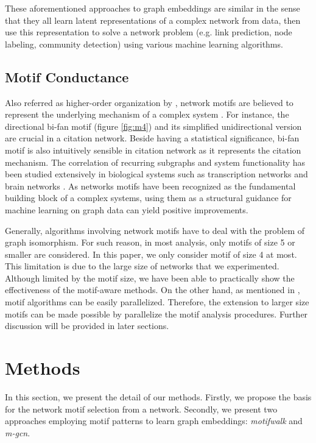 \documentclass{article}
\theoremstyle{definition}
\begin{document}
These aforementioned approaches to graph embeddings
are similar in the sense that they all learn latent representations
of a complex network from data, then use this representation to solve 
a network problem (e.g. link prediction, node labeling, community
detection) using various machine learning algorithms.

\subsection{Motif Conductance}

Also referred as higher-order organization by \citeauthor{juremotif}, 
network motifs are believed to represent the underlying mechanism of a 
complex system 
\cite{netmotif,alon2006introduction,mangan2003structure}. 
For instance, the directional bi-fan motif (figure \ref{fig:m4})
and its simplified unidirectional version are crucial in a citation 
network. Beside having a statistical significance, bi-fan motif is also 
intuitively sensible in citation network as it represents the citation 
mechanism. The correlation of recurring subgraphs and system 
functionality has been studied extensively in biological systems such as 
transcription networks \cite{mangan2003structure} and brain 
networks \cite{brainnetheuvel,honey2007network}. As networks motifs
have been recognized as the fundamental building block of a complex
systems, using them as a structural guidance for machine learning
on graph data can yield positive improvements.

Generally, algorithms involving network motifs have to deal with
the problem of graph isomorphism. For such reason, in most analysis,
only motifs of size 5 or smaller are considered. In this paper,
we only consider motif of size 4 at most. This limitation is due to
the large size of networks that we experimented. Although limited 
by the motif size, we have been able to practically show the 
effectiveness of the motif-aware methods. On the other hand, as mentioned 
in \cite{juremotif},
motif algorithms can be easily parallelized. Therefore, the extension to
larger size motifs can be made possible by parallelize the motif
analysis procedures. Further discussion will be provided in later 
sections.

\section{Methods}

In this section, we present the detail of our methods. Firstly,
we propose the basis for the network motif selection from a network.
Secondly, we present two approaches employing motif patterns to
learn graph embeddings: \emph{motifwalk} and \emph{m-gcn}.
\end{document}

